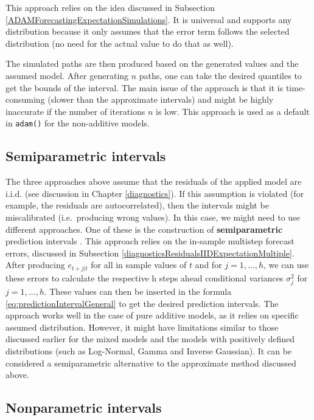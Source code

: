 \documentclass[]{book}
\theoremstyle{definition}
\theoremstyle{definition}
\theoremstyle{definition}
\theoremstyle{definition}
\theoremstyle{remark}
\begin{document}
This approach relies on the idea discussed in Subsection \ref{ADAMForecastingExpectationSimulations}. It is universal and supports any distribution because it only assumes that the error term follows the selected distribution (no need for the actual value to do that as well).

The simulated paths are then produced based on the generated values and the assumed model. After generating \(n\) paths, one can take the desired quantiles to get the bounds of the interval. The main issue of the approach is that it is time-consuming (slower than the approximate intervals) and might be highly inaccurate if the number of iterations \(n\) is low. This approach is used as a default in \texttt{adam()} for the non-additive models.

\hypertarget{semiparametric-intervals}{%
\subsection{Semiparametric intervals}\label{semiparametric-intervals}}

The three approaches above assume that the residuals of the applied model are i.i.d. (see discussion in Chapter \ref{diagnostics}). If this assumption is violated (for example, the residuals are autocorrelated), then the intervals might be miscalibrated (i.e.~producing wrong values). In this case, we might need to use different approaches. One of these is the construction of \textbf{semiparametric} prediction intervals \citep[see, for example,][]{Lee2014}. This approach relies on the in-sample multistep forecast errors, discussed in Subsection \ref{diagnosticsResidualsIIDExpectationMultiple}. After producing \(e_{t+j|t}\) for all in sample values of \(t\) and for \(j=1,\dots,h\), we can use these errors to calculate the respective h steps ahead conditional variances \(\sigma_j^2\) for \(j=1,\dots,h\). These values can then be inserted in the formula \eqref{eq:predictionIntervalGeneral} to get the desired prediction intervals. The approach works well in the case of pure additive models, as it relies on specific assumed distribution. However, it might have limitations similar to those discussed earlier for the mixed models and the models with positively defined distributions (such as Log-Normal, Gamma and Inverse Gaussian). It can be considered a semiparametric alternative to the approximate method discussed above.

\hypertarget{nonparametric-intervals}{%
\subsection{Nonparametric intervals}\label{nonparametric-intervals}}
\end{document}
